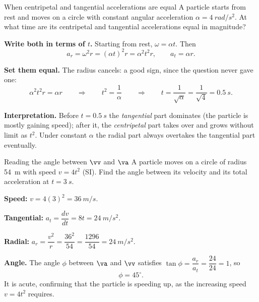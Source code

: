 \begin{exbox}{When centripetal and tangential accelerations are equal}
A particle starts from rest and moves on a circle with constant angular acceleration
$\alpha=\SI{4}{rad/s^2}$. At what time are its centripetal and tangential accelerations equal in
magnitude?

 \textbf{Write both in terms of $t$.} Starting from rest, $\omega=\alpha t$. Then
\[
a_r=\omega^{2}r=(\alpha t)^{2}r=\alpha^{2}t^{2}r,
\qquad
a_t=\alpha r.
\]

 \textbf{Set them equal.} The radius cancels: a good sign, since the question never gave
one:
\[
\alpha^{2}t^{2}r=\alpha r
\qquad\Longrightarrow\qquad
t^{2}=\frac{1}{\alpha}
\qquad\Longrightarrow\qquad
t=\frac{1}{\sqrt\alpha}=\frac{1}{\sqrt4}=\SI{0.5}{s}.
\]

 \textbf{Interpretation.} Before $t=\SI{0.5}{s}$ the \emph{tangential} part dominates (the
particle is mostly gaining speed); after it, the \emph{centripetal} part takes over and grows without
limit as $t^{2}$. Under constant $\alpha$ the radial part always overtakes the tangential part
eventually. 
\end{exbox}

\begin{exbox}{Reading the angle between $\vv$ and $\va$}
A particle moves on a circle of radius \SI{54}{m} with speed $v=4t^{2}$ (SI). Find the angle between its
velocity and its total acceleration at $t=\SI{3}{s}$.

 \textbf{Speed:} $v=4(3)^{2}=\SI{36}{m/s}$.

 \textbf{Tangential:} $a_t=\dfrac{dv}{dt}=8t=\SI{24}{m/s^2}$.

 \textbf{Radial:} $a_r=\dfrac{v^{2}}{r}=\dfrac{36^{2}}{54}=\dfrac{1296}{54}=\SI{24}{m/s^2}$.

 \textbf{Angle.} The angle $\phi$ between $\va$ and $\vv$ satisfies
$\tan\phi=\dfrac{a_r}{a_t}=\dfrac{24}{24}=1$, so
\[
\phi=45^\circ.
\]
It is acute, confirming that the particle is speeding up, as the increasing speed $v=4t^{2}$ requires.
\end{exbox}

